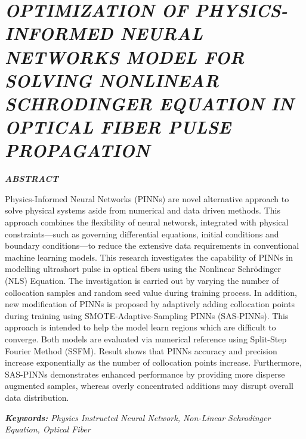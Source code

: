 \chapter*{\textit{OPTIMIZATION OF PHYSICS-INFORMED NEURAL
    NETWORKS MODEL FOR SOLVING NONLINEAR
    SCHRODINGER EQUATION IN OPTICAL FIBER PULSE
    PROPAGATION}}
\begin{center}
	\vspace{0.5cm}
	\textbf{\textit{ABSTRACT}}
\end{center}
Physics-Informed Neural Networks (PINNs) are novel alternative approach to solve physical systems aside from numerical and data driven methods. This approach combines the flexibility of neural networsk, integrated with physical constraints---such as governing differential equations, initial conditions and boundary conditions---to reduce the extensive data requirements in conventional machine learning models. This research investigates the capability of PINNs in modelling ultrashort pulse in optical fibers using the Nonlinear Schr\"{o}dinger (NLS) Equation. The investigation is carried out by varying the number of collocation samples and random seed value during training process. In addition, new modification of PINNs is proposed by adaptively adding collocation points during training using SMOTE-Adaptive-Sampling PINNs (SAS-PINNs). This approach is intended to help the model learn regions which are difficult to converge. Both models are evaluated via numerical reference using Split-Step Fourier Method (SSFM). Result shows that PINNs accuracy and precision increase exponentially as the number of collocation points increase. Furthermore, SAS-PINNs demonstrates enhanced performance by providing more disperse augmented samples, whereas overly concentrated additions may disrupt overall data distribution.

\noindent \textit{\textbf{Keywords:} Physics Instructed Neural Network, Non-Linear Schrodinger Equation, Optical Fiber}

\cleardoublepage
